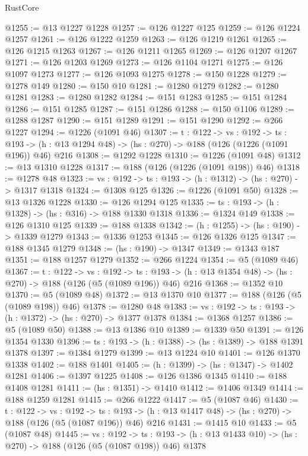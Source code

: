 \begin{lexlean}{RustCore}
\begin{coremodule}
@1255 := @13 @1227 @1228
@1257 := @126 @1227 @125
@1259 := @126 @1224 @1257
@1261 := @126 @1222 @1259
@1263 := @126 @1219 @1261
@1265 := @126 @1215 @1263
@1267 := @126 @1211 @1265
@1269 := @126 @1207 @1267
@1271 := @126 @1203 @1269
@1273 := @126 @1104 @1271
@1275 := @126 @1097 @1273
@1277 := @126 @1093 @1275
@1278 := @150 @1228
@1279 := @1278 @149
@1280 := @150 @10
@1281 := @1280 @1279
@1282 := @1280 @1281
@1283 := @1280 @1282
@1284 := @151 @1283
@1285 := @151 @1284
@1286 := @151 @1285
@1287 := @151 @1286
@1288 := @150 @1106
@1289 := @1288 @1287
@1290 := @151 @1289
@1291 := @151 @1290
@1292 := @266 @1227
@1294 := @1226 (@1091 @46)
@1307 := {t : @122} ->
  {vs : @192} ->
  {ts : @193} -> (h : @13 @1294 @48) -> (hs : @270) -> @188 (@126 (@1226 (@1091 @196)) @46) @216
@1308 := @1292 @1228
@1310 := @1226 (@1091 @48)
@1312 := @13 @1310 @1228
@1317 := @188 (@126 (@1226 (@1091 @198)) @46)
@1318 := @1278 @48
@1323 := {vs : @192} -> {ts : @193} -> (h : @1312) -> (hs : @270) -> @1317 @1318
@1324 := @1308 @125
@1326 := @1226 (@1091 @50)
@1328 := @13 @1326 @1228
@1330 := @126 @1294 @125
@1335 := {ts : @193} -> (h : @1328) -> (hs : @316) -> @188 @1330 @1318
@1336 := @1324 @149
@1338 := @126 @1310 @125
@1339 := @188 @1338
@1342 := (h : @1255) -> (hs : @190) -> @1339 @1279
@1343 := @1336 @1253
@1345 := @126 @1326 @125
@1347 := @188 @1345 @1279
@1348 := (hs : @190) -> @1347
@1349 := @1343 @187
@1351 := @188 @1257 @1279
@1352 := @266 @1224
@1354 := @5 (@1089 @46)
@1367 := {t : @122} ->
  {vs : @192} ->
  {ts : @193} -> (h : @13 @1354 @48) -> (hs : @270) -> @188 (@126 (@5 (@1089 @196)) @46) @216
@1368 := @1352 @10
@1370 := @5 (@1089 @48)
@1372 := @13 @1370 @10
@1377 := @188 (@126 (@5 (@1089 @198)) @46)
@1378 := @1280 @48
@1383 := {vs : @192} -> {ts : @193} -> (h : @1372) -> (hs : @270) -> @1377 @1378
@1384 := @1368 @1257
@1386 := @5 (@1089 @50)
@1388 := @13 @1386 @10
@1389 := @1339 @50
@1391 := @126 @1354 @1330
@1396 := {ts : @193} -> (h : @1388) -> (hs : @1389) -> @188 @1391 @1378
@1397 := @1384 @1279
@1399 := @13 @1224 @10
@1401 := @126 @1370 @1338
@1402 := @188 @1401
@1405 := (h : @1399) -> (hs : @1347) -> @1402 @1281
@1406 := @1397 @1225
@1408 := @126 @1386 @1345
@1410 := @188 @1408 @1281
@1411 := (hs : @1351) -> @1410
@1412 := @1406 @1349
@1414 := @188 @1259 @1281
@1415 := @266 @1222
@1417 := @5 (@1087 @46)
@1430 := {t : @122} ->
  {vs : @192} ->
  {ts : @193} -> (h : @13 @1417 @48) -> (hs : @270) -> @188 (@126 (@5 (@1087 @196)) @46) @216
@1431 := @1415 @10
@1433 := @5 (@1087 @48)
@1445 := {vs : @192} ->
  {ts : @193} -> (h : @13 @1433 @10) -> (hs : @270) -> @188 (@126 (@5 (@1087 @198)) @46) @1378

\end{coremodule}
\end{lexlean}
